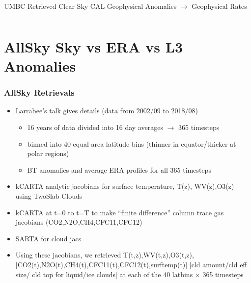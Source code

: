\documentclass[10pt,t]{beamer}
\begin{document}
\begin{frame}{UMBC Retrieved Clear Sky CAL Geophysical Anomalies $\rightarrow$ Geophysical Rates}
\begin{columns}
\begin{column}{0.45\columnwidth}

\end{column}
\end{columns}
\end{frame}

\section{AllSky Sky vs ERA vs L3 Anomalies}
\begin{frame}
  \frametitle{AllSky Retrievals}
  \begin{itemize}
    \item Larrabee's talk gives details (data from 2002/09 to 2018/08)
      \begin{itemize}
        \item 16 years of data divided into 16 day averages $\rightarrow$ 365 timesteps
        \item binned into 40 equal area latitude bins (thinner in equator/thicker at polar regions)
        \item BT anomalies and average ERA profiles for all 365 timesteps
      \end{itemize}
    \item kCARTA analytic jacobians for surface temperature, T(z), WV(z),O3(z) using TwoSlab Clouds
    \item kCARTA at t=0 to t=T to make ``finite difference'' column trace gas jacobians
          (CO2,N2O,CH4,CFC11,CFC12)
    \item SARTA for cloud jacs
    \item Using these jacobians, we retrieved T(t,z),WV(t,z),O3(t,z),[CO2(t),N2O(t),CH4(t),CFC11(t),CFC12(t),surftemp(t)]
          [cld amount/cld eff size/ cld top for liquid/ice clouds] at each of the 40 latbins $\times $ 365 timesteps
  \end{itemize}
\end{frame}
\end{document}
